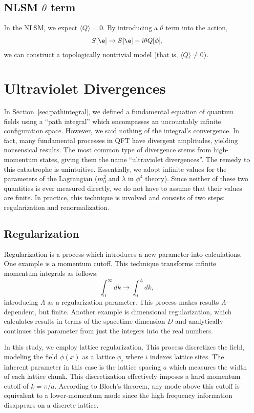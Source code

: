 \subsection{NLSM $\theta$ term}
In the NLSM, we expect $\langle Q \rangle=0$. By introducing a $\theta$ term into the action,
\begin{equation}
    S[\e] \rightarrow S[\e] - i \theta Q[\phi],
\end{equation}
we can construct a topologically nontrivial model (that is, $\langle Q \rangle \neq 0$).

\section{Ultraviolet Divergences}

In Section~\ref{sec:pathintegral},  we defined a fundamental equation of quantum fields using a ``path integral'' which encompasses an uncountably infinite configuration space. However, we said nothing of the integral's convergence. In fact, many fundamental processes in QFT have divergent amplitudes, yielding nonsensical results. The most common type of divergence stems from high-momentum states, giving them the name ``ultraviolet divergences''. The remedy to this catastrophe is unintuitive. Essentially, we adopt infinite values for the parameters of the Lagrangian ($m_0^2$ and $\lambda$ in $\phi^4$ theory). Since neither of these two quantities is ever measured directly, we do not have to assume that their values are finite. In practice, this technique is involved and consists of two steps: regularization and renormalization.


\subsection{Regularization}
Regularization is a process which introduces a new parameter into calculations. One example is a momentum cutoff. This technique transforms infinite momentum integrals as follows:  
\begin{equation*}
    \int_0^\infty dk \rightarrow \int_0^\Lambda dk,
\end{equation*}
introducing $\Lambda$ as a regularization parameter. This process makes results $\Lambda$-dependent, but finite. Another example is dimensional regularization, which calculates results in terms of the spacetime dimension $D$ and analytically continues this parameter from just the integers into the real numbers. 

In this study, we employ lattice regularization. This process discretizes the field, modeling the field $\phi(x)$ as a lattice $\phi_i$ where $i$ indexes lattice sites. The inherent parameter in this case is the lattice spacing $a$ which measures the width of each lattice chunk. This discretization effectively imposes a hard momentum cutoff of $k=\pi/a$. According to Bloch's theorem, any mode above this cutoff is equivalent to a lower-momentum mode since the high frequency information disappears on a discrete lattice.

